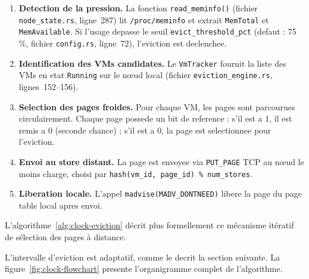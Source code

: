 \begin{enumerate}
    \item \textbf{Detection de la pression.} La fonction \texttt{read\_meminfo()} (fichier \texttt{node\_state.rs}, ligne~287) lit \texttt{/proc/meminfo} et extrait \texttt{MemTotal} et \texttt{MemAvailable}. Si l'usage depasse le seuil \texttt{evict\_threshold\_pct} (defaut : 75\,\%, fichier \texttt{config.rs}, ligne~72), l'eviction est declenchee.
    \item \textbf{Identification des VMs candidates.} Le \texttt{VmTracker} fournit la liste des VMs en etat \texttt{Running} sur le nœud local (fichier \texttt{eviction\_engine.rs}, lignes~152--156).
    \item \textbf{Selection des pages froides.} Pour chaque VM, les pages sont parcourues circulairement. Chaque page possede un bit de reference : s'il est a 1, il est remis a 0 (seconde chance) ; s'il est a 0, la page est selectionnee pour l'eviction.
    \item \textbf{Envoi au store distant.} La page est envoyee via \texttt{PUT\_PAGE} TCP au nœud le moins charge, choisi par \texttt{hash(vm\_id, page\_id) \% num\_stores}.
    \item \textbf{Liberation locale.} L'appel \texttt{madvise(MADV\_DONTNEED)} libere la page du page table local apres envoi.
\end{enumerate}

L'algorithme~\ref{alg:clock-eviction} décrit plus formellement ce mécanisme itératif de sélection des pages à distance.

\begin{algorithm}[H]
    \DontPrintSemicolon

    \caption{Sélection de page froide par approximation CLOCK}
    \label{alg:clock-eviction}
\end{algorithm}

L'intervalle d'eviction est adaptatif, comme le decrit la section suivante. La figure~\ref{fig:clock-flowchart} presente l'organigramme complet de l'algorithme.

